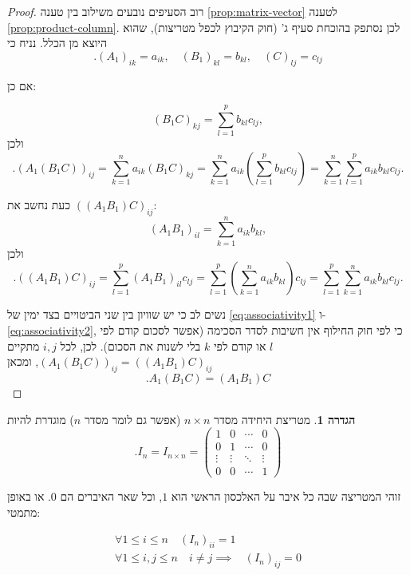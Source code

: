 \documentclass[12pt]{report}
\theoremstyle{plain}
\theoremstyle{definition}
\newtheorem{definition}[theorem]{הגדרה}
\newcommand{\0}{\mathbf{0}}
\begin{document}
\begin{proof}
רוב הסעיפים נובעים משילוב בין טענה
\ref{prop:matrix-vector}
לטענה
\ref{prop:product-column}.
לכן נסתפק בהוכחת סעיף ג' (חוק הקיבוץ לכפל מטריצות), שהוא היוצא מן הכלל. נניח כי
$$
.(A_1)_{ik} = a_{ik}, \quad
(B_1)_{kl} = b_{kl}, \quad
(C)_{lj} = c_{lj}
$$

אם כן:

$$
(B_1C)_{kj} = \sum_{l=1}^{p} b_{kl} c_{lj},
$$
ולכן
\begin{equation}\label{eq:associativity1}
.(A_1(B_1C))_{ij} = \sum_{k=1}^{n}a_{ik}(B_1C)_{kj}
             = \sum_{k=1}^{n} a_{ik} \left( \sum_{l=1}^{p} b_{kl} c_{lj} \right)
             = \sum_{k=1}^{n} \sum_{l=1}^{p}a_{ik}b_{kl}c_{lj}.
\end{equation}

כעת נחשב את
$((A_1B_1)C)_{ij}$:
$$
(A_1B_1)_{il} = \sum_{k=1}^{n}a_{ik}b_{kl},
$$
ולכן
\begin{equation}\label{eq:associativity2}
.((A_1B_1)C)_{ij} = \sum_{l=1}^{p}(A_1B_1)_{il}c_{l j}
              = \sum_{l=1}^{p} \left( \sum_{k=1}^{n}a_{ik}b_{kl}\right) c_{l j}
              = \sum_{l=1}^{p}\sum_{k=1}^{n} a_{ik}b_{kl}c_{lj}.
\end{equation}

נשים לב כי יש שוויון בין שני הביטויים בצד ימין של
\ref{eq:associativity1}
ו-
\ref{eq:associativity2},
כי לפי חוק החילוף אין חשיבות לסדר הסכימה (אפשר לסכום קודם לפי 
$l$
או קודם לפי 
$k$
בלי לשנות את הסכום). לכן, לכל
$i,j$
מתקיים
$(A_1(B_1C))_{ij}=((A_1B_1)C)_{ij} $, ומכאן
$$
.A_1(B_1C)=(A_1B_1)C
$$
\end{proof}

\begin{definition}
מטריצת היחידה מסדר 
$n\times n$
(אפשר גם לומר מסדר $n$)
מוגדרת להיות
$$
.I_n=I_{n\times n}=
\begin{pmatrix}
1 &0 &\cdots &0\\
0 &1 &\cdots &0\\
\vdots &\vdots &\ddots &\vdots\\
0 &0 &\cdots &1
\end{pmatrix}
$$

זוהי המטריצה שבה כל איבר על האלכסון הראשי הוא
$1$,
וכל שאר האיברים הם
$0$. 
או באופן מתמטי:

$$
\begin{aligned}
\forall 1\leq i\leq n \quad (I_n)_{ii}=1 \\
\forall 1\leq i,j\leq n  \quad i\neq j \implies &(I_n)_{ij}=0
\end{aligned}
$$
\end{definition}
\end{document}
